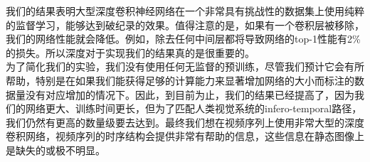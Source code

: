 我们的结果表明大型深度卷积神经网络在一个非常具有挑战性的数据集上使用纯粹的监督学习，能够达到破纪录的效果。值得注意的是，如果有一个卷积层被移除，我们的网络性能就会降低。例如，除去任何中间层都将导致网络的top-1性能有2\%的损失。所以深度对于实现我们的结果真的是很重要的。\\

为了简化我们的实验，我们没有使用任何无监督的预训练，尽管我们预计它会有所帮助，特别是在如果我们能获得足够的计算能力来显著增加网络的大小而标注的数据量没有对应增加的情况下。因此，到目前为止，我们的结果已经提高了，因为我们的网络更大、训练时间更长，但为了匹配人类视觉系统的infero-temporal路径，我们仍然有更高的数量级要去达到。最终我们想在视频序列上使用非常大型的深度卷积网络，视频序列的时序结构会提供非常有帮助的信息，这些信息在静态图像上是缺失的或极不明显。
